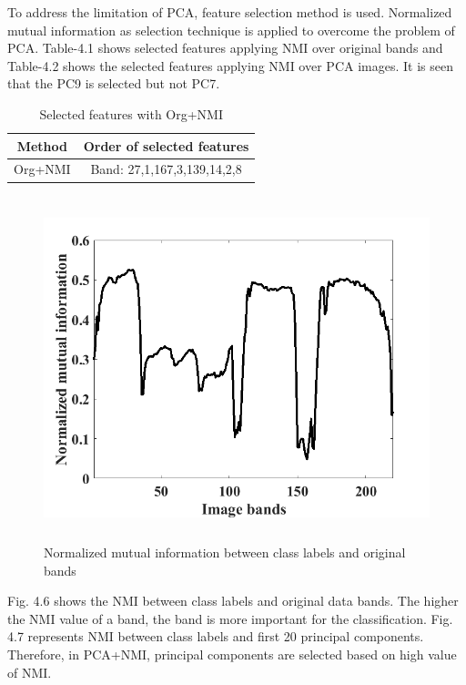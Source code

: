 \documentclass[document.tex]{subfiles}
\begin{document}
To address the limitation of PCA, feature selection method is used. Normalized mutual information as selection technique is applied to overcome the problem of PCA. Table-4.1 shows selected features applying NMI over original bands and Table-4.2 shows the selected features applying NMI over PCA images. It is seen that the PC9 is selected but not PC7. 
\begin{table}[H]
	\caption{Selected features with Org+NMI}
	\begin{center}
		\begin{tabular}{|c|c|}
			\hline
			Method & Order of selected features\\ \hline
			Org+NMI & Band: 27,1,167,3,139,14,2,8\\ \hline
		\end{tabular}
	\end{center}
	\label{tab:Selected features with Org+NMI}
\end{table}
\begin{figure}[H]
	\begin{center}
		\includegraphics[height=10.0cm]{imgs/OrgNmi.png}
	\end{center}
	\caption{Normalized mutual information between class labels and original bands}
	\label{fig:Normalized mutual information between class labels and original bands}
\end{figure}

\noindent Fig. 4.6 shows the NMI between class labels and original data bands. The higher the NMI value of a band, the band is more important for the classification. Fig. 4.7 represents NMI between class labels and first 20 principal components. Therefore, in PCA+NMI, principal components are selected based on high value of NMI. 
\end{document}
